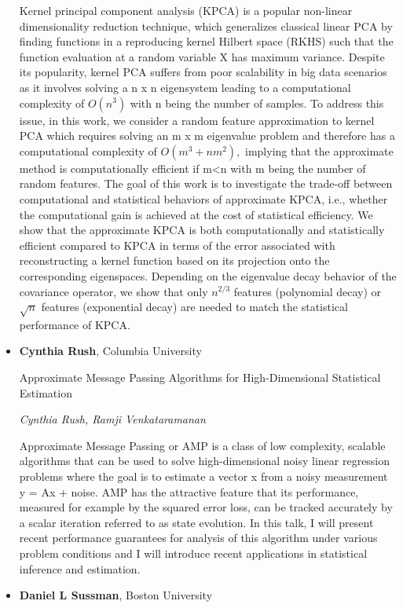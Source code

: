 \begin{itemize}
Kernel principal component analysis (KPCA) is a popular non-linear dimensionality reduction technique, which generalizes classical linear PCA by finding functions in a reproducing kernel Hilbert space (RKHS) such that the function evaluation at a random variable X has maximum variance. Despite its popularity, kernel PCA suffers from poor scalability in big data scenarios as it involves solving a n x n eigensystem leading to a computational complexity of $O(n^3)$ with n being the number of samples. To address this issue, in this work, we consider a random feature approximation to kernel PCA which requires solving an m x m eigenvalue problem and therefore has a computational complexity of $O(m^3+nm^2),$ implying that the approximate method is computationally efficient if m<n with m being the number of random features. The goal of this work is to investigate the trade-off between computational and statistical behaviors of approximate KPCA, i.e., whether the computational gain is achieved at the cost of statistical efficiency. We show that the approximate KPCA is both computationally and statistically efficient compared to KPCA in terms of the error associated with reconstructing a kernel function based on its projection onto the corresponding eigenspaces. Depending on the eigenvalue decay behavior of the covariance operator, we show that only $n^{2/3}$ features (polynomial decay) or $\sqrt{n}$ features (exponential decay) are needed to match the statistical performance of KPCA.

\item \textbf{Cynthia Rush}, Columbia University

Approximate Message Passing Algorithms for High-Dimensional Statistical Estimation

\emph{\footnotesize Cynthia Rush, Ramji Venkataramanan}

Approximate Message Passing or AMP is a class of low complexity, scalable algorithms that can be used to solve high-dimensional noisy linear regression problems where the goal is to estimate a vector x from a noisy measurement y = Ax + noise.  AMP has the attractive feature that its performance, measured for example by the squared error loss, can be tracked accurately by a scalar iteration referred to as state evolution.  In this talk, I will present recent performance guarantees for analysis of this algorithm under various problem conditions and I will introduce recent applications in statistical inference and estimation.

\item \textbf{Daniel L Sussman}, Boston University


\end{itemize}
